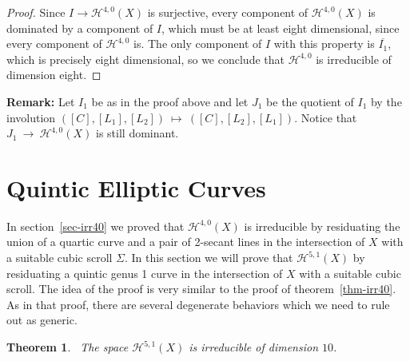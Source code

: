 \documentclass[twoside,12pt,reqno]{amsart}
\theoremstyle{plain}
\newtheorem{thm}{Theorem}[section]
\theoremstyle{definition}
\newcommand{\Hdg}[2]{\mathcal{H}^{#1,#2}}
\def\ps{\vspace{4pt}}
\begin{document}
\begin{proof}
\ps

Since $I\rightarrow \Hdg{4}{0}(X)$ is surjective, every 
component of $\Hdg{4}{0}(X)$
is dominated by a component of $I$, which must be at least eight dimensional,
since every component of $\Hdg{4}{0}$ is.  The only component of $I$ with this
property is $\overline{I_1}$, which is precisely eight dimensional, so we 
conclude that $\Hdg{4}{0}$ is irreducible of dimension eight.
\end{proof}

\textbf{Remark:}
Let $I_1$ be as in the proof above and let $J_1$ be the quotient of
$I_1$ by the involution $([C],[L_1],[L_2])~\mapsto~ ([C],[L_2],[L_1])$.
Notice that $J_1~\rightarrow~ \Hdg{4}{0}(X)$ is still dominant.



\section{Quintic Elliptic Curves}\label{sec-irr51}

In section~\ref{sec-irr40} we proved that $\Hdg{4}{0}(X)$ is
irreducible by residuating the union of a quartic curve and a pair of
2-secant lines in the intersection of $X$ with a suitable cubic scroll 
$\Sigma$.  In this section we will prove that $\Hdg{5}{1}(X)$ by
residuating a quintic genus 1 curve in the intersection of $X$ with a
suitable cubic scroll.  The idea of the proof is very similar to the
proof of theorem~\ref{thm-irr40}.  As in that proof, there are several 
degenerate behaviors which we need to rule out as generic.

\ps

\begin{thm}~\label{thm-irr51} 
The space $\Hdg{5}{1}(X)$ is irreducible of dimension $10$.
\end{thm}
\end{document}
